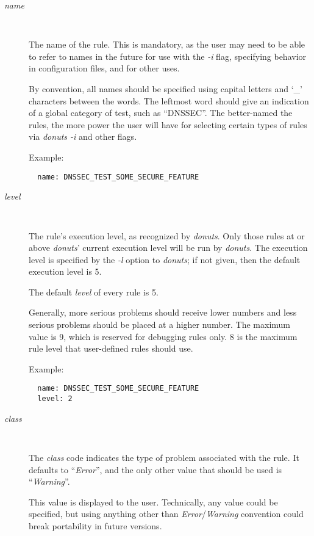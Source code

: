 \begin{description}

\item [{\it name}]\verb" "

The name of the rule.  This is mandatory, as the user may need to be
able to refer to names in the future for use with the {\it -i} flag,
specifying behavior in configuration files, and for other uses.

By convention, all names should be specified using capital letters and
`\_' characters between the words.  The leftmost word should give an
indication of a global category of test, such as ``DNSSEC''.  The
better-named the rules, the more power the user will have for
selecting certain types of rules via {\it donuts -i} and other flags.

Example:

\begin{verbatim}  name: DNSSEC_TEST_SOME_SECURE_FEATURE\end{verbatim}

\item [{\it level}]\verb" "

The rule's execution level, as recognized by {\it donuts}.  Only those
rules at or above {\it donuts}' current execution level will be run by
{\it donuts}.  The execution level is specified by the {\it -l} option to
{\it donuts}; if not given, then the default execution level is 5.

The default {\it level} of every rule is 5.

Generally, more serious problems should receive lower numbers and
less serious problems should be placed at a higher number.  The
maximum value is 9, which is reserved for debugging rules only.
8 is the maximum rule level that user-defined rules should use.

Example:

\begin{verbatim}
  name: DNSSEC_TEST_SOME_SECURE_FEATURE
  level: 2
\end{verbatim}

\item [{\it class}]\verb" "

The {\it class} code indicates the type of problem associated with the
rule.  It defaults to ``{\it Error}'', and the only other value that should
be used is ``{\it Warning}''.

This value is displayed to the user.  Technically, any value could be
specified, but using anything other than {\it Error}/{\it Warning} convention
could break portability in future versions.


\end{description}
